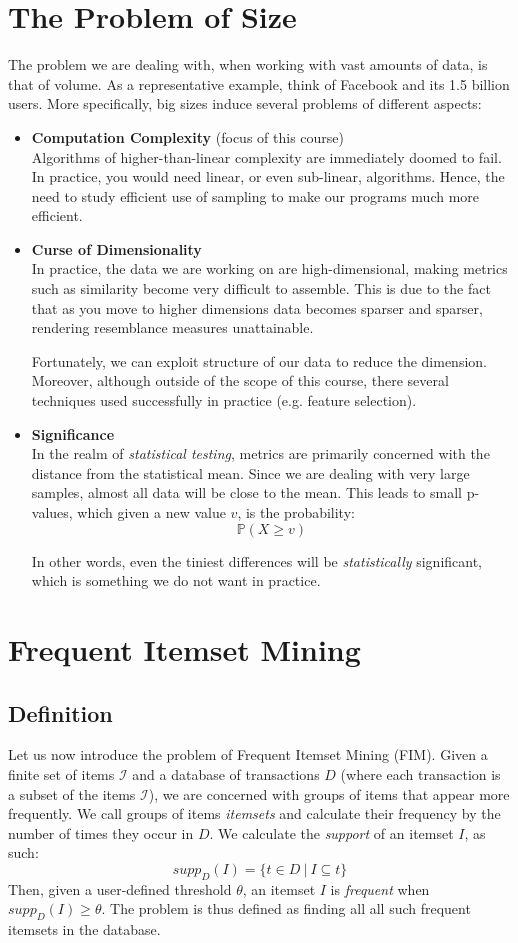 \documentclass[11pt]{sigplanconf}
\renewcommand\it{\textit}
\renewcommand\bf{\textbf}
\newcommand\I{\mathcal{I}}
\begin{document}
\section{The Problem of Size}
The problem we are dealing with, when working with vast amounts of data, is that of volume. As a representative example, think of Facebook and its 1.5 billion users.
More specifically, big sizes induce several problems of different aspects:
\begin{itemize}
\item \bf{Computation Complexity} (focus of this course)\\
Algorithms of higher-than-linear complexity are immediately doomed to fail. In practice, you would need linear, or even sub-linear, algorithms. Hence, the need to study efficient use of sampling to make our programs much more efficient.
\item \bf{Curse of Dimensionality}\\
In practice, the data we are working on are high-dimensional, making metrics such as similarity become very difficult to assemble. This is due to the fact that as you move to higher dimensions data becomes sparser and sparser, rendering resemblance measures unattainable.

Fortunately, we can exploit structure of our data to reduce the dimension. Moreover, although outside of the scope of this course, there several techniques used successfully in practice (e.g. feature selection).
\item \bf{Significance}\\
In the realm of \it{statistical testing}, metrics are primarily concerned with the distance from the statistical mean. Since we are dealing with very large samples, almost all data will be close to the mean. This leads to small p-values, which given a new value $v$, is the probability:
\[ \mathds{P}(X \geq v) \]

In other words, even the tiniest differences will be \it{statistically} significant, which is something we do not want in practice.
\end{itemize}

\section{Frequent Itemset Mining}

\subsection{Definition}
Let us now introduce the problem of Frequent Itemset Mining (FIM). Given a finite set of items $\I$ and a database of transactions $D$ (where each transaction is a subset of the items $\I$), we are concerned with groups of items that appear more frequently. We call groups of items \it{itemsets} and calculate their frequency by the number of times they occur in $D$. We calculate the \it{support} of an itemset $I$, as such:
\[ supp_D(I) = \{ t \in D \ | \ I \subseteq t \} \]
Then, given a user-defined threshold $\theta$, an itemset $I$ is \it{frequent} when $supp_D(I) \geq \theta$. The problem is thus defined as finding all all such frequent itemsets in the database.
\end{document}
